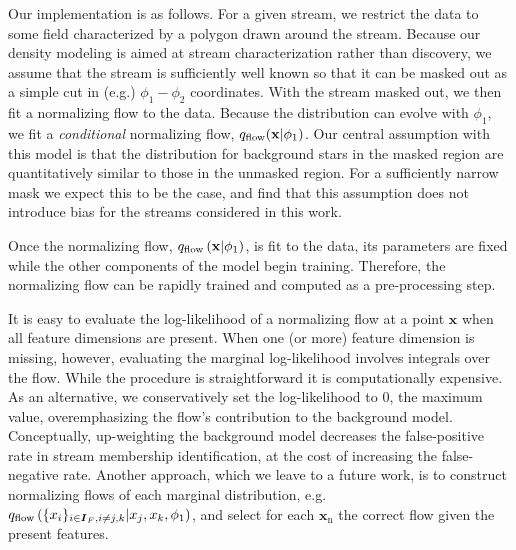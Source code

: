\documentclass[twocolumn]{aastex631}
\newcommand{\mrm}[1]{\mathrm{#1}}
\newcommand{\mbs}[1]{\boldsymbol{#1}}
\newcommand{\nth}[1]{{#1}_{\mrm{n}}}  %
\begin{document}
        Our implementation is as follows. For a given stream, we restrict the
        data to some field characterized by a polygon drawn around the stream.
        Because our density modeling is aimed at stream characterization rather
        than discovery, we assume that the stream is sufficiently well known so
        that it can be masked out as a simple cut in (e.g.) $\phi_1-\phi_2$
        coordinates. With the stream masked out, we then fit a normalizing flow
        to the data. Because the distribution can evolve with $\phi_1$, we fit a
        \emph{conditional} normalizing flow, $q_{\rm flow}(\mathbf{x}|\phi_1)$.
        Our central assumption with this model is that the distribution for
        background stars in the masked region are quantitatively similar to
        those in the unmasked region. For a sufficiently narrow mask we expect
        this to be the case, and find that this assumption does not introduce
        bias for the streams considered in this work.

        Once the normalizing flow, $q_{\rm flow}\left(\mathbf{x} |
        \phi_1\right)$, is fit to the data, its parameters are fixed while the
        other components of the model begin training. Therefore, the normalizing
        flow can be rapidly trained and computed as a pre-processing step.

        It is easy to evaluate the log-likelihood of a normalizing flow at a
        point $\mbs{x}$ when all feature dimensions are present. When one (or
        more) feature dimension is missing, however, evaluating the marginal
        log-likelihood involves integrals over the flow. While the procedure is
        straightforward it is computationally expensive. As an alternative, we
        conservatively set the log-likelihood to $0$, the maximum value,
        overemphasizing the flow's contribution to the background model.
        Conceptually, up-weighting the background model decreases the
        false-positive rate in stream membership identification, at the cost of
        increasing the false-negative rate.  Another approach, which we leave to
        a future work, is to construct normalizing flows of each marginal
        distribution, e.g. $q_{\rm flow}\left(\{x_i\}_{i \in \mbs{I}_F, i \neq
        {j, k}} | x_j, x_k, \phi_1\right)$, and select for each $\nth{\mbs{x}}$
        the correct flow given the present features.



    \vspace{10pt}
\end{document}
